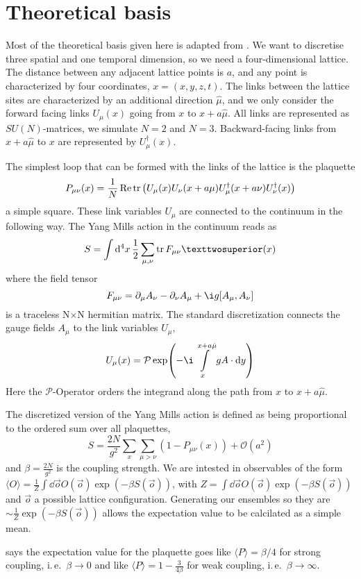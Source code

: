 \documentclass[%
 reprint,
 amsmath,amssymb,
 aps,
]{revtex4-1}
\renewcommand{\Re}{\operatorname{Re}}
\begin{document}
\section{Theoretical basis}

Most of the theoretical basis given here is adapted from \citet{lepagelqcd}. We want to discretise three spatial and one temporal dimension, so we need a four-dimensional lattice. The distance between any adjacent lattice points is $a$, and any point is characterized by four coordinates, $x=(x,y,z,t)$. The links between the lattice sites are characterized by an additional direction $\hat{\mu}$, and we only consider the forward facing links $U_\mu(x)$ going from $x$ to $x+a\hat{\mu}$. All links are represented as $SU(N)$-matrices, we simulate $N=2$ and $N=3$. Backward-facing links from $x+a\hat{\mu}$ to $x$ are represented by $U_\mu^\dagger(x)$.

The simplest loop that can be formed with the links of the lattice is the plaquette \[P_{\mu\nu}(x)=\frac{1}{N}\Re\tr\left(U_\mu(x)U_\nu(x+a\mu)U_\mu^\dagger(x+a\nu)U^\dagger_\nu(x)\right)\] a simple square. These link variables $U_\mu$ are connected to the continuum in the following way. The Yang Mills action in the continuum reads as \[S=\int\dd{^4x}\dfrac{1}{2}\sum\limits_{\mu,\nu}\tr F_{\mu\nu}²(x)\] where the field tensor\[F_{\mu\nu}=\partial_\mu A_\nu-\partial_\nu A_\mu+\i g [A_\mu,A_\nu]\] is a traceless N$\times$N hermitian matrix. The standard discretization connects the gauge fields $A_\mu$ to the link variables $U_\mu$, \[U_\mu(x)=\mathcal{P}\exp(-\i\int\limits_{x}^{x+a\hat{\mu}}g A\cdot\dd{y})\]
Here the $\mathcal{P}$-Operator orders the integrand along the path from $x$ to $x+a\hat{\mu}$.

The discretized version of the Yang Mills action is defined as being proportional to the ordered sum over all plaquettes, \[S=\frac{2N}{g^2}\sum_{x}\sum_{\mu>\nu}\left(1-P_{\mu\nu}(x)\right)+\mathcal{O}(a^2)\]
and $\beta=\frac{2N}{g^2}$ is the coupling strength. We are intested in observables of the form $\langle O\rangle=\frac{1}{Z}\int \dd \vec{o} O(\vec{o}) \exp(-\beta S(\vec{o}))$, with $ Z=\int \dd \vec{o} O(\vec{o}) \exp(-\beta S(\vec{o}))$ and $\vec{o}$ a possible lattice configuration. Generating our ensembles so they are $\sim \frac{1}{Z} \exp(-\beta S(\vec{o}))$ allows the expectation value to be calcilated as a simple mean.

\citet{creutzsu2} says the expectation value for the plaquette goes like $\langle P \rangle=\beta/4$ for strong coupling, i.\,e.\, $\beta\to 0$ and like $\langle P \rangle =1-\frac{3}{4\beta}$ for weak coupling, i.\,e.\, $\beta\to \infty$.
\end{document}

